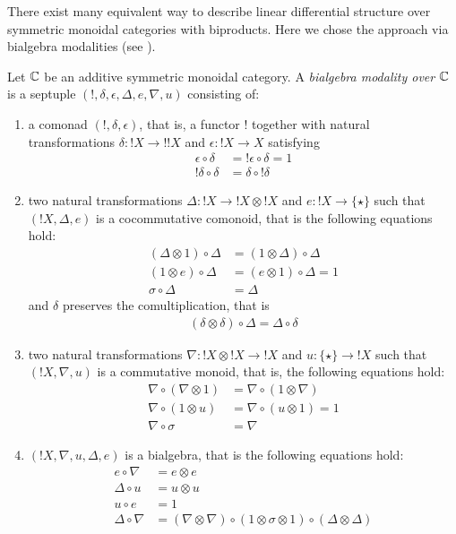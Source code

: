 There exist many equivalent way to describe linear differential structure over symmetric monoidal categories with biproducts. Here we chose the approach via bialgebra modalities (see \cite{Lemay2017, Blute2019}).


\begin{definition}
Let $\mathbb{C}$ be an additive symmetric monoidal category. A \emph{bialgebra modality over $\mathbb{C}$} is a septuple $(!,\delta,\epsilon, \Delta, e,\nabla, u)$ consisting of:
\begin{enumerate}
\item a comonad $(!,\delta,\epsilon)$, that is, a functor $!$ together with natural transformations $\delta: !X\to !!X$ and $\epsilon:!X\to X$ satisfying
\begin{align}
\epsilon \circ \delta & = !\epsilon \circ \delta= 1 \\
!\delta \circ \delta  & = \delta\circ !\delta
\end{align}

\item two natural transformations $\Delta:!X\to !X\otimes !X$ and $e:!X\to \{\star\}$ such that $(!X, \Delta, e)$ is a cocommutative comonoid, that is the following equations hold:
\begin{align}
(\Delta \otimes  1)\circ \Delta & = ( 1\otimes \Delta )\circ \Delta \\
 ( 1\otimes e)\circ \Delta & = (e\otimes  1)\circ \Delta =1 \\
\sigma \circ\Delta& =  \Delta
\end{align}
and $\delta$ preserves the comultiplication, that is
\begin{align}
(\delta \otimes \delta)\circ \Delta = \Delta \circ \delta
\end{align}

\item two natural transformations $\nabla: !X\otimes !X \to !X$ and $u:\{\star\}\to !X$ such that $(!X,\nabla, u)$ is a commutative monoid, that is, the following equations hold:
\begin{align}
\nabla\circ (\nabla\otimes 1)  & = \nabla \circ (1\otimes \nabla) \\
 \nabla \circ(1\otimes u )& = \nabla \circ  (u\otimes 1) =1\\
\nabla\circ \sigma & = \nabla
\end{align}

\item $(!X,\nabla, u, \Delta, e)$ is a bialgebra, that is the following equations hold:
\begin{align}
e\circ\nabla  & =  e\otimes e\\
 \Delta \circ u& = u\otimes u \\
u\circ e & = 1\\
 \Delta \circ \nabla 
&=(\nabla\otimes \nabla)\circ (1\otimes \sigma\otimes 1)\circ (\Delta\otimes \Delta)
\end{align}


\end{enumerate}
\end{definition}
